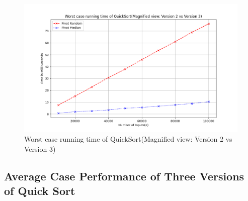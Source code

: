 \documentclass[a4paper,12pt]{report}
\begin{document}
\begin{figure}[H]
    \centering
    \includegraphics[width=1.1\textwidth]{./Worst_case_QuickSort _Magnified_view.png}
    \caption{Worst case running time of QuickSort(Magnified view: Version 2 vs Version 3)}
    \label{fig:quicksort_median_pivot}
\end{figure}

\subsection{Average Case Performance of Three Versions of Quick Sort}
\end{document}
